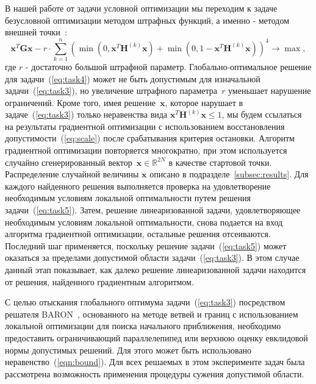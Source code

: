 В нашей работе от задачи условной оптимизации мы переходим к задаче безусловной оптимизации методом штрафных функций, а именно -
методом внешней точки~\cite{eremin:convex,aoki:mo}:
\begin{equation}
       \textbf{x}^{T}\textbf{Gx} - r\cdot \sum_{k=1}^n
       \left( \min\left(0,\textbf{x}^{T}\textbf{H}^{(k)}\textbf{x}\right) +
       \min\left(0,1-\textbf{x}^{T}\textbf{H}^{(k)}\textbf{x}\right)\right)^4 \rightarrow
       \max,
     \label{eq:task4}
\end{equation}
где $r$ - достаточно большой штрафной параметр. Глобально-оптимальное решение для задачи~(\ref{eq:task4}) может не быть допустимым для изначальной задачи~(\ref{eq:task3}), но увеличение штрафного параметра~$r$ уменьшает нарушение ограничений. Кроме того, имея решение~$\textbf{x}$, которое нарушает в задаче~(\ref{eq:task3}) только неравенства вида $\textbf{x}^{T}\textbf{H}^{(k)}\textbf{x} \leq 1$, мы будем ссылаться на результаты градиентной оптимизации с использованием восстановления допустимости~(\ref{eq:scale}) после срабатывания критерия остановки. Алгоритм градиентной оптимизации повторяется многократно, при этом используется случайно сгенерированный вектор~$\textbf{x}\in \mathbb{R}^{2N}$ в качестве стартовой точки. Распределение случайной величины $\textbf{x}$ описано в подразделе~\ref{subsec:results}. Для каждого найденного решения выполняется проверка на удовлетворение необходимым условиям локальной оптимальности путем решения задачи~(\ref{eq:task5}). Затем, решение линеаризованной задачи, удовлетворяющее  необходимым условиям локальной оптимальности, снова подается на вход алгоритма градиентной оптимизации, остальные решения отсеиваются. Последний шаг применяется, поскольку решение задачи~(\ref{eq:task5}) может оказаться за пределами допустимой области задачи~(\ref{eq:task3}). В этом случае данный этап показывает, как далеко решение линеаризованной задачи находится от решения, найденного градиентным алгоритмом.

С целью отыскания глобального оптимума задачи~(\ref{eq:task3}) посредством решателя BARON~\cite{tawarmalani:global}, основанного на методе ветвей и границ с использованием локальной оптимизации для поиска начального приближения, необходимо предоставить ограничивающий параллелепипед или верхнюю оценку евклидовой нормы допустимых решений. Для этого может быть использовано неравенство~(\ref{eqn:bound}). Для всех решаемых в этом эксперименте задач была рассмотрена возможность применения процедуры сужения допустимой области.

